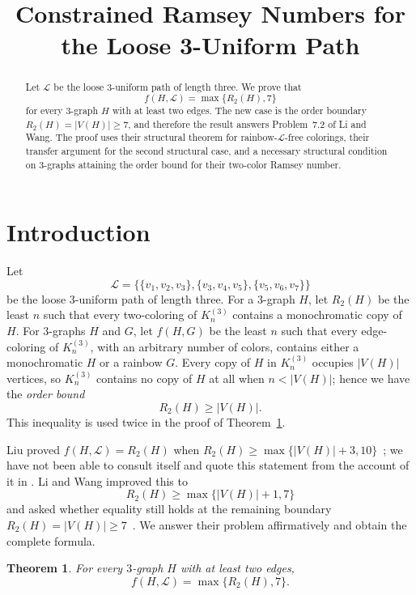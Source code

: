 \documentclass[11pt]{amsart}
\title[Constrained Ramsey numbers for the loose path]{Constrained Ramsey Numbers for the Loose 3-Uniform Path}
\date{}
\newtheorem{theorem}{Theorem}
\newcommand{\Lpath}{\mathcal L}
\begin{document}
\begin{abstract}
Let $\Lpath$ be the loose $3$-uniform path of length three. We prove that
\[
  f(H,\Lpath)=\max\{R_2(H),7\}
\]
for every $3$-graph $H$ with at least two edges. The new case is the order
boundary $R_2(H)=|V(H)|\ge 7$, and therefore the result answers
Problem~7.2 of Li and Wang. The proof uses their structural theorem for
rainbow-$\Lpath$-free colorings, their transfer argument for the second
structural case, and a necessary structural condition on $3$-graphs
attaining the order bound for their two-color Ramsey number.
\end{abstract}

\maketitle

\section{Introduction}

Let
\[
\Lpath=
\bigl\{
  \{v_1,v_2,v_3\},
  \{v_3,v_4,v_5\},
  \{v_5,v_6,v_7\}
\bigr\}
\]
be the loose $3$-uniform path of length three. For a $3$-graph $H$, let
$R_2(H)$ be the least $n$ such that every two-coloring of $K_n^{(3)}$
contains a monochromatic copy of $H$. For $3$-graphs $H$ and $G$, let
$f(H,G)$ be the least $n$ such that every edge-coloring of $K_n^{(3)}$,
with an arbitrary number of colors, contains either a monochromatic $H$
or a rainbow $G$. Every copy of $H$ in $K_n^{(3)}$ occupies $|V(H)|$
vertices, so $K_n^{(3)}$ contains no copy of $H$ at all when
$n<|V(H)|$; hence we have the \emph{order bound}
\[
  R_2(H)\ge|V(H)|.
\]
This inequality is used twice in the proof of Theorem~\ref{thm:main}.

Liu proved $f(H,\Lpath)=R_2(H)$ when
$R_2(H)\ge\max\{|V(H)|+3,10\}$~\cite{Liu}; we have not been able to
consult \cite{Liu} itself and quote this statement from the account of it
in \cite[Theorem~1.7]{LiWang}. Li and Wang improved this to
\[
  R_2(H)\ge\max\{|V(H)|+1,7\}
\]
and asked whether equality still holds at the remaining boundary
$R_2(H)=|V(H)|\ge7$~\cite[Theorem~1.10 and Problem~7.2]{LiWang}.
We answer their problem affirmatively and obtain the complete formula.

\begin{theorem}\label{thm:main}
For every $3$-graph $H$ with at least two edges,
\[
  f(H,\Lpath)=\max\{R_2(H),7\}.
\]
\end{theorem}
\end{document}
